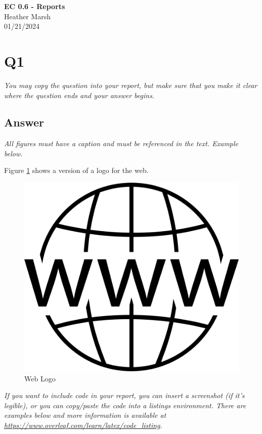 \documentclass[12pt]{article}
\begin{document}
\begin{centering}
{\large\textbf{EC 0.6 - Reports}}\\ 
Heather Marsh\\
01/21/2024\\
\end{centering}


\section*{Q1}

\emph{You may copy the question into your report, but make sure that you make it clear where the question ends and your answer begins.}

\subsection*{Answer}

\emph{All figures must have a caption and must be referenced in the text. Example below.}

Figure \ref{fig:enter-label} shows a version of a logo for the web.
\begin{figure}[H]
    \centering
    \includegraphics[width=0.25\linewidth]{Web-Logo.png}
    \caption{Web Logo}
    \label{fig:enter-label}
\end{figure}
\begin{figure}[h!]
    \centering
    \label{fig:web-logo}
\end{figure}

\emph{If you want to include code in your report, you can insert a screenshot (if it's legible), or you can copy/paste the code into a listings environment. There are examples below and more information is available at \url{https://www.overleaf.com/learn/latex/code_listing}.}
\end{document}
